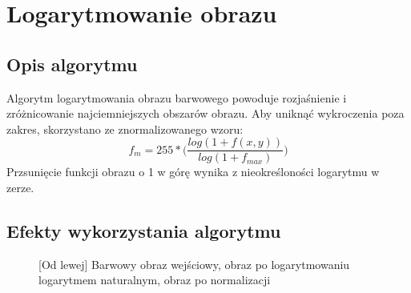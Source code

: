 \documentclass[a4paper,12pt, titlepage]{report}
\begin{document}
\section{Logarytmowanie obrazu}
\subsection*{Opis algorytmu}
\par Algorytm logarytmowania obrazu barwowego powoduje rozjaśnienie i zróżnicowanie najciemniejszych obszarów obrazu. Aby uniknąć wykroczenia poza zakres, skorzystano ze znormalizowanego wzoru: \[f_{m}=255*\Big(\frac{log(1+f(x,y))}{log(1+f_{max})}\Big)\]Przsunięcie funkcji obrazu o 1 w górę wynika z nieokreśloności logarytmu w zerze.
\subsection*{Efekty wykorzystania algorytmu}
\begin{figure}[h]
    \centering
    \caption{[Od lewej] Barwowy obraz wejściowy, obraz po logarytmowaniu logarytmem naturalnym, obraz po normalizacji}%
    \label{fig:rysunek}%
\end{figure}
\end{document}
